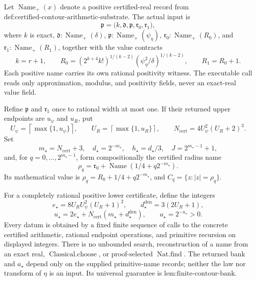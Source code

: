 Let \(\operatorname{Name}_{+}(x)\) denote a positive certified-real record from \(\text{def:certified-contour-arithmetic-substrate}\).  The actual input is
\[
 \mathfrak p=
 \bigl(k,\mathfrak d,\mathfrak p,\mathfrak r_0,\mathfrak r_1\bigr),
\]
where \(k\) is exact, \(\mathfrak d:\operatorname{Name}_{+}(\delta)\), \(\mathfrak p:\operatorname{Name}_{+}(\psi_{\eta})\), \(\mathfrak r_0:\operatorname{Name}_{+}(R_0)\), and \(\mathfrak r_1:\operatorname{Name}_{+}(R_1)\), together with the value contracts
\[
 k=r+1,\qquad
 R_0=(2^{k+4}k!)^{1/(k-2)}
       (\psi_{\eta}^2/\delta)^{1/(k-2)},
 \qquad R_1=R_0+1.
\]
Each positive name carries its own rational positivity witness.  The executable call reads only approximation, modulus, and positivity fields, never an exact-real value field.

Refine \(\mathfrak p\) and \(\mathfrak r_1\) once to rational width at most one.  If their returned upper endpoints are \(u_{\psi}\) and \(u_R\), put
\[
 U_{\psi}=\left\lceil\max\{1,u_{\psi}\}\right\rceil,
 \qquad
 U_R=\left\lceil\max\{1,u_R\}\right\rceil,
 \qquad
 N_{\mathrm{cert}}=4U_{\psi}^2(U_R+2)^3.
\]
Set
\[
 m_{\star}=N_{\mathrm{cert}}+3,
 \quad d_{\star}=2^{-m_{\star}},
 \quad h_{\star}=d_{\star}/3,
 \quad J=2^{m_{\star}-1}+1,
\]
and, for \(q=0,\ldots,2^{m_{\star}-1}\), form compositionally the certified radius name
\[
 \mathfrak\rho_q
 =\mathfrak r_0+\operatorname{Name}(1/4+q2^{-m_{\star}}).
\]
Its mathematical value is \(\rho_q=R_0+1/4+q2^{-m_{\star}}\), and \(C_q=\{z:|z|=\rho_q\}\).

For a completely rational positive lower certificate, define the integers
\[
 e_{\star}=8U_RU_{\psi}^2(U_R+1)^2,
 \qquad d_{\star}^{\mathrm{den}}=3(2U_R+1),
\]
\[
 u_{\star}=2e_{\star}
 +N_{\mathrm{cert}}(m_{\star}+d_{\star}^{\mathrm{den}}),
 \qquad a_{\star}=2^{-u_{\star}}>0.
\]
Every datum is obtained by a fixed finite sequence of calls to the concrete certified arithmetic, rational endpoint operations, and primitive recursion on displayed integers.  There is no unbounded search, reconstruction of a name from an exact real, \(\operatorname{Classical.choose}\), or proof-selected \(\operatorname{Nat.find}\).  The returned bank and \(a_{\star}\) depend only on the supplied primitive-name records; neither the law nor transform of \(\eta\) is an input.  Its universal guarantee is \(\text{lem:finite-contour-bank}\).